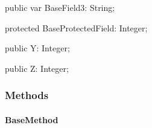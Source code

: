\documentclass{report}
\newif\ifpdf
\begin{document}
\begin{list}{}
\par  \label{ok_inherited_members.TBase-BaseField3}
\item[\textbf{BaseField3}\hfill]
\ifpdf
\begin{flushleft}
\fi
\begin{ttfamily}
public var BaseField3: String;\end{ttfamily}

\ifpdf
\end{flushleft}
\fi


\par  \label{ok_inherited_members.TBase-BaseProtectedField}
\item[\textbf{BaseProtectedField}\hfill]
\ifpdf
\begin{flushleft}
\fi
\begin{ttfamily}
protected BaseProtectedField: Integer;\end{ttfamily}

\ifpdf
\end{flushleft}
\fi


\par  \label{ok_inherited_members.TBase-Y}
\item[\textbf{Y}\hfill]
\ifpdf
\begin{flushleft}
\fi
\begin{ttfamily}
public Y: Integer;\end{ttfamily}

\ifpdf
\end{flushleft}
\fi


\par  \label{ok_inherited_members.TBase-Z}
\item[\textbf{Z}\hfill]
\ifpdf
\begin{flushleft}
\fi
\begin{ttfamily}
public Z: Integer;\end{ttfamily}

\ifpdf
\end{flushleft}
\fi


\par  \end{list}
\subsubsection*{\large{\textbf{Methods}}\normalsize\hspace{1ex}\hfill}
\paragraph*{BaseMethod}\hspace*{\fill}
\end{document}
